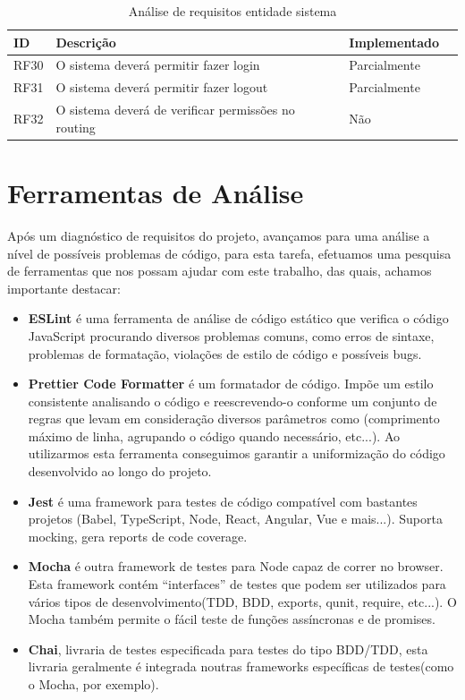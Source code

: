 \documentclass[a4paper,12pt]{article} %
\begin{document}
\begin{table}[H]
	\centering
	\begin{tabular}{|l|p{12cm}|l|r|}
		\hline
		\textbf{ID} & \textbf{Descrição} & \textbf{Implementado}\\
		\hline
		RF30 & O sistema deverá permitir fazer login & Parcialmente\footnotemark[4] \\
		\hline
		RF31 & O sistema deverá permitir fazer logout & Parcialmente\footnotemark[4] \\
		\hline
		RF32 & O sistema deverá de verificar permissões no routing & Não \\
		\hline
	\end{tabular}
	\caption{Análise de requisitos entidade sistema}
\end{table}

\newpage
\section{Ferramentas de Análise}
Após um diagnóstico de requisitos do projeto, avançamos para uma análise a nível de possíveis problemas de código, para esta tarefa, efetuamos uma pesquisa de ferramentas que nos possam ajudar com este trabalho, das quais, achamos importante destacar:

\begin{itemize}
	\item \textbf{ESLint} é uma ferramenta de análise de código estático que verifica o código JavaScript procurando diversos problemas comuns, como erros de sintaxe, problemas de formatação, violações de estilo de código e possíveis bugs.

	\item \textbf{Prettier Code Formatter} é um formatador de código. Impõe um estilo consistente analisando o código e reescrevendo-o conforme um conjunto de regras que levam em consideração diversos parâmetros como (comprimento máximo de linha, agrupando o código quando necessário, etc...). Ao utilizarmos esta ferramenta conseguimos garantir a uniformização do código desenvolvido ao longo do projeto.

	\item \textbf{Jest} é uma framework para testes de código compatível com bastantes projetos (Babel, TypeScript, Node, React, Angular, Vue e mais...). Suporta mocking, gera reports de code coverage.

	\item \textbf{Mocha} é outra framework de testes para Node capaz de correr no browser. Esta framework contém “interfaces” de testes que podem ser utilizados para vários tipos de desenvolvimento(TDD, BDD, exports, qunit, require, etc...). O Mocha também permite o fácil teste de funções assíncronas e de promises.

	\item \textbf{Chai}, livraria de testes especificada para testes do tipo BDD/TDD, esta livraria geralmente é integrada noutras frameworks específicas de testes(como o Mocha, por exemplo).
\end{itemize}
\end{document}
